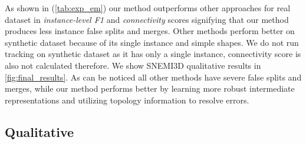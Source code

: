 As shown in (\autoref{tab:exp_em}) our method outperforms other approaches for real dataset in {\em instance-level F1} and {\em connectivity} scores signifying that our method produces less instance false splits and merges. Other methods perform better on synthetic dataset because of its single instance and simple shapes. We do not run tracking on synthetic dataset as it has only a single instance, connectivity score is also not calculated therefore.
We show SNEMI3D qualitative results in \autoref{fig:final_results}. As can be noticed all other methods have severe false splits and merges, while our method performs better by learning more robust intermediate representations and utilizing topology information to resolve errors.

\subsection{Qualitative}

